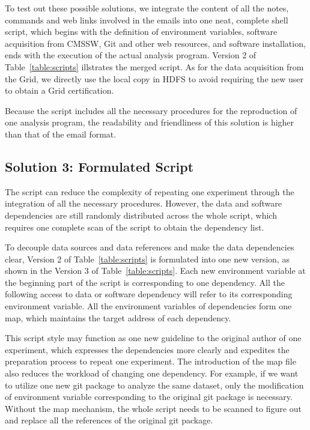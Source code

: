 \documentclass{acm_proc_article-sp}
\begin{document}
To test out these possible solutions, we integrate the content of all the notes, commands and web links involved in the emails into one neat, complete shell script, which begins with the definition of environment variables, software acquisition from CMSSW, Git and other web resources, and software installation, ends with the execution of the actual analysis program. Version 2 of Table~\ref{table:scripts} illstrates the merged script. As for the data acquisition from the Grid, we directly use the local copy in HDFS to avoid requiring the new user to obtain a Grid certification.



Because the script includes all the necessary procedures for the reproduction
of one analysis program, the readability and friendliness of this solution is
higher than that of the email format. 


\subsection{Solution 3: Formulated Script}

The script can reduce the complexity of repeating one experiment through the integration of all the necessary procedures. However, the data and software dependencies are still randomly distributed across the whole script, which requires one complete scan of the script to obtain the  dependency list. 

To decouple data sources and data references and make the data dependencies clear, Version 2 of Table~\ref{table:scripts} is formulated into one new version, as shown in
the Version 3 of Table~\ref{table:scripts}. Each new environment variable at the beginning part of
the script is corresponding to one dependency. All the following access to data
or software dependency will refer to its corresponding environment variable.
All the environment variables of dependencies form one map, which maintains the
target address of each dependency.

This script style may function as one new guideline to the original author of
one experiment, which expresses the dependencies more clearly and expedites the
preparation process to repeat one experiment. The introduction of the map file
also reduces the workload of changing one dependency. For example, if we want
to utilize one new git package to analyze the same dataset, only the modification of
environment variable corresponding to the original git package is necessary.
Without the map mechanism, the whole script needs to be scanned to figure out and
replace all the references of the original git package.
\end{document}

